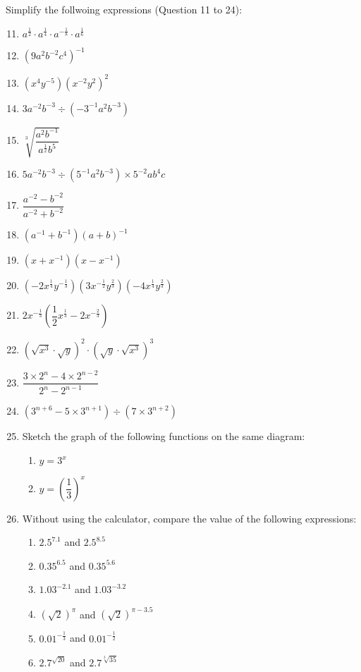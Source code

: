 \documentclass[12pt]{report}
\begin{document}
\begin{multicols}{2}
  \noindent Simplify the follwoing expressions (Question 11 to 24):
  \begin{enumerate}
    \setcounter{enumi}{10}
    \item $a^{\frac{1}{2}}\cdot a^{\frac{1}{4}}\cdot a^{-{\frac{1}{8}}}\cdot a^{\frac{1}{6}}$
    \item $\left(9a^{2}b^{-2}c^{4}\right)^{-1}$
    \item $\left(x^{4}y^{-5}\right)\left(x^{-2}y^{2}\right)^{2}$
    \item $3a^{-2}b^{-3}\div\left(-3^{-1}a^{2}b^{-3}\right)$
    \item $\sqrt[3]{\dfrac{a^{2}b^{-1}}{a^{\frac{1}{2}}b^{5}}}$
    \item $5a^{-2}b^{-3}\div\left(5^{-1}a^{2}b^{-3}\right)\times 5^{-2}a b^{4}c$
    \item $\dfrac{a^{-2}-b^{-2}}{a^{-2}+b^{-2}}$
    \item $\left(a^{-1}+b^{-1}\right)\left(a+b\right)^{-1}$
    \item $\left(x+x^{-1}\right)\left(x-x^{-1}\right)$
    \item $\left(-2x^{\frac{1}{4}}y^{-\frac{1}{3}}\right)\left(3x^{-\frac{1}{2}}y^{\frac{2}{3}}\right)\left(-4x^{\frac{1}{4}}y^{\frac{2}{3}}\right)$
    \item $2x^{-{\frac{1}{3}}}\left({\dfrac{1}{2}}x^{{\frac{1}{3}}}-2x^{-{\frac{2}{3}}}\right)$
    \item $\left(\sqrt{x^{3}}\cdot\sqrt{y}\right)^{2}\cdot\left(\sqrt{y}\cdot\sqrt{x^{3}}\right)^{3}$
    \item $\dfrac{3\times2^{n}-4\times2^{n-2}}{2^{n}-2^{n-1}}$
    \item $\left(3^{n+6}-5\times3^{n+1}\right)\div\left(7\times3^{n+2}\right)$
    \item Sketch the graph of the following functions on the same diagram:
          \begin{enumerate}[label=(\alph*)]
            \item $y = 3^x$
            \item $y = \left(\dfrac{1}{3}\right)^x$
          \end{enumerate}
    \item Without using the calculator, compare the value of the following expressions:
          \begin{enumerate}
            \item $2.5^{7.1}$ and $2.5^{8.5}$
            \item $0.35^{6.5}$ and $0.35^{5.6}$
            \item $1.03^{-2.1}$ and $1.03^{-3.2}$
            \item $\left(\sqrt{2}\right)^\pi$ and $\left(\sqrt{2}\right)^{\pi - 3.5}$
            \item $0.01^{-\frac{1}{3}}$ and $0.01^{-\frac{1}{2}}$
            \item $2.7^{\sqrt{20}}$ and $2.7^{\sqrt[3]{35}}$
          \end{enumerate}


\end{enumerate}
\end{multicols}
\end{document}
